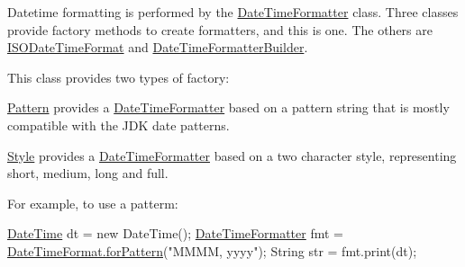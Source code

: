 Datetime formatting is performed by the \hyperlink{classorg_1_1joda_1_1time_1_1format_1_1_date_time_formatter}{Date\-Time\-Formatter} class. Three classes provide factory methods to create formatters, and this is one. The others are \hyperlink{classorg_1_1joda_1_1time_1_1format_1_1_i_s_o_date_time_format}{I\-S\-O\-Date\-Time\-Format} and \hyperlink{classorg_1_1joda_1_1time_1_1format_1_1_date_time_formatter_builder}{Date\-Time\-Formatter\-Builder}. 

This class provides two types of factory\-: 
\begin{DoxyItemize}
\item \hyperlink{classorg_1_1joda_1_1time_1_1format_1_1_date_time_format_a89cdac18d2f89035aeba6db480d5957a}{Pattern} provides a \hyperlink{classorg_1_1joda_1_1time_1_1format_1_1_date_time_formatter}{Date\-Time\-Formatter} based on a pattern string that is mostly compatible with the J\-D\-K date patterns. 
\item \hyperlink{classorg_1_1joda_1_1time_1_1format_1_1_date_time_format_a85cf0faa2f6a8fca06fb6987f6e286d2}{Style} provides a \hyperlink{classorg_1_1joda_1_1time_1_1format_1_1_date_time_formatter}{Date\-Time\-Formatter} based on a two character style, representing short, medium, long and full. 
\end{DoxyItemize}

For example, to use a patterm\-: 
\begin{DoxyPre}
\hyperlink{classorg_1_1joda_1_1time_1_1_date_time}{DateTime} dt = new DateTime();
\hyperlink{classorg_1_1joda_1_1time_1_1format_1_1_date_time_formatter}{DateTimeFormatter} fmt = \hyperlink{classorg_1_1joda_1_1time_1_1format_1_1_date_time_format_a89cdac18d2f89035aeba6db480d5957a}{DateTimeFormat.forPattern}("MMMM, yyyy");
String str = fmt.print(dt);
\end{DoxyPre}


